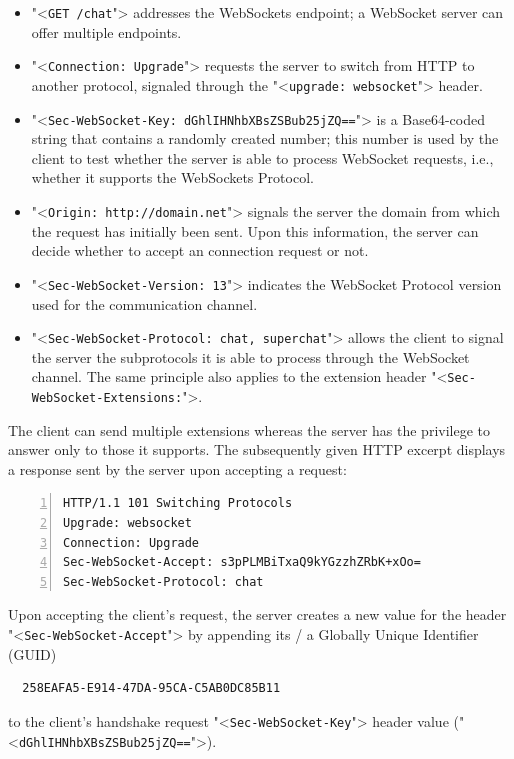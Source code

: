 \documentclass[a4paper, justified, notoc]{tufte-handout} %
\begin{document}
\begin{itemize}
	\item "<\texttt{GET /chat}"> addresses the WebSockets endpoint; a WebSocket server can offer multiple endpoints. 
	\item "<\texttt{Connection: Upgrade}"> requests the server to switch from HTTP to another protocol, signaled through the "<\texttt{upgrade: websocket}"> header. 
	\item "<\texttt{Sec-WebSocket-Key: dGhlIHNhbXBsZSBub25jZQ==}"> is a Base64-coded string that contains a randomly created number; this number is used by the client to test whether the server is able to process WebSocket requests, i.e., whether it supports the WebSockets Protocol. 
	\item "<\texttt{Origin: http://domain.net}"> signals the server the domain from which the request has initially been sent. Upon this information, the server can decide whether to accept an connection request or not.
	\item  "<\texttt{Sec-WebSocket-Version: 13}"> indicates the WebSocket Protocol version used for the communication channel. 
	\item  "<\texttt{Sec-WebSocket-Protocol: chat, superchat}"> allows the client to signal the server the subprotocols it is able to process through the WebSocket channel. The same principle also applies to the extension header "<\texttt{Sec-WebSocket-Extensions:}">. 
\end{itemize} 

The client can send multiple extensions whereas the server has the privilege to answer only to those it supports. The subsequently given HTTP excerpt displays a response sent by the server upon accepting a request: %

\begin{Verbatim}[gobble=0,frame=lines,numbers=left]
HTTP/1.1 101 Switching Protocols
Upgrade: websocket
Connection: Upgrade
Sec-WebSocket-Accept: s3pPLMBiTxaQ9kYGzzhZRbK+xOo= 
Sec-WebSocket-Protocol: chat
\end{Verbatim}

Upon accepting the client's request, the server creates a new value for the header "<\texttt{Sec-WebSocket-Accept}"> by appending its / a Globally Unique Identifier (GUID)
\begin{Verbatim}
  258EAFA5-E914-47DA-95CA-C5AB0DC85B11
\end{Verbatim}
to the client's handshake request "<\texttt{Sec-WebSocket-Key}"> header value ("<\texttt{dGhlIHNhbXBsZSBub25jZQ==}">).
\end{document}

